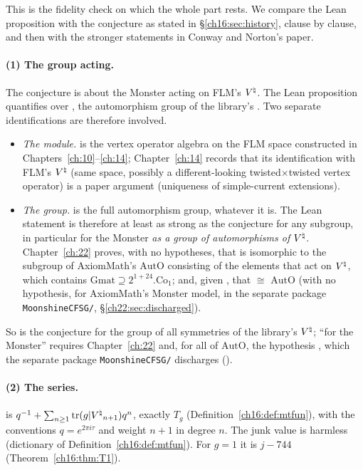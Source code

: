 This is the fidelity check on which the whole part rests.  We compare the Lean proposition with the conjecture as
stated in \S\ref{ch16:sec:history}, clause by clause, and then with the stronger statements in Conway and Norton's
paper.

\paragraph{(1) The group acting.}  The conjecture is about the Monster acting on FLM's ${V^{\natural}}$.  The Lean proposition
quantifies over , the automorphism group of the library's .  Two separate identifications
are therefore involved.
\begin{itemize}
\item \emph{The module.}   is the vertex operator algebra on the FLM space constructed in
  Chapters~\ref{ch:10}--\ref{ch:14}; Chapter~\ref{ch:14} records that its identification with FLM's ${V^{\natural}}$ (same
  space, possibly a different-looking twisted$\times$twisted vertex operator) is a paper argument (uniqueness of
  simple-current extensions).
\item \emph{The group.}   is the full automorphism group, whatever it is.  The Lean statement is
  therefore at least as strong as the conjecture for any subgroup, in particular for the Monster \emph{as a group of
  automorphisms of ${V^{\natural}}$}.  Chapter~\ref{ch:22} proves, with no hypotheses, that  is isomorphic to the
  subgroup of AxiomMath's $\mathrm{AutO}$ consisting of the elements that act on ${V^{\natural}}$, which contains
  $\mathrm{Gmat}\supseteq2^{1+24}.\mathrm{Co}_1$; and, given , that  $\cong$
  $\mathrm{AutO}$ (with no hypothesis, for AxiomMath's Monster model, in the separate package
  \texttt{MoonshineCFSG/}, \S\ref{ch22:sec:discharged}).
\end{itemize}
So  is the conjecture for the group of all symmetries of the library's ${V^{\natural}}$; ``for the
Monster'' requires Chapter~\ref{ch:22} and, for all of $\mathrm{AutO}$, the hypothesis , which
the separate package \texttt{MoonshineCFSG/} discharges ().

\paragraph{(2) The series.}   is $q^{-1}+\sum_{n\ge1}\operatorname{tr}(g|{V^{\natural}}_{n+1})q^n$, exactly
$T_g$ (Definition~\ref{ch16:def:mtfun}), with the conventions $q=e^{2\pi i\tau}$ and weight $n+1$ in degree $n$.  The
 junk value is harmless (dictionary of Definition~\ref{ch16:def:mtfun}).  For $g=1$ it is $j-744$
(Theorem~\ref{ch16:thm:T1}).

